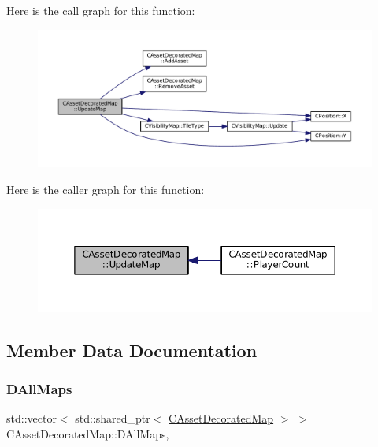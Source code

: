 Here is the call graph for this function\+:\nopagebreak
\begin{figure}[H]
\begin{center}
\leavevmode
\includegraphics[width=350pt]{classCAssetDecoratedMap_a7b594b6bef2eed8bbb0e4e4e6b855903_cgraph}
\end{center}
\end{figure}
Here is the caller graph for this function\+:\nopagebreak
\begin{figure}[H]
\begin{center}
\leavevmode
\includegraphics[width=350pt]{classCAssetDecoratedMap_a7b594b6bef2eed8bbb0e4e4e6b855903_icgraph}
\end{center}
\end{figure}


\subsection{Member Data Documentation}
\hypertarget{classCAssetDecoratedMap_a32cdd80c7e9d31d8ce5397dd6d61dc4b}{}\label{classCAssetDecoratedMap_a32cdd80c7e9d31d8ce5397dd6d61dc4b} 
\subsubsection{\texorpdfstring{D\+All\+Maps}{DAllMaps}}
{\footnotesize\ttfamily std\+::vector$<$ std\+::shared\+\_\+ptr$<$ \hyperlink{classCAssetDecoratedMap}{C\+Asset\+Decorated\+Map} $>$ $>$ C\+Asset\+Decorated\+Map\+::\+D\+All\+Maps\hspace{0.3cm}{\ttfamily [static]}, {\ttfamily [protected]}}



